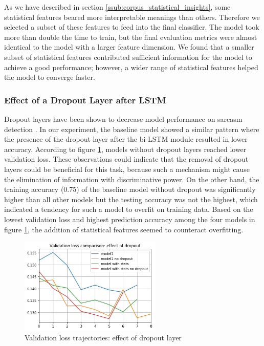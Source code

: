 \documentclass[12pt]{diazessay} %
\begin{document}
{As we have described in section \ref{ssub:corpus_statistical_insights}, some statistical features beared more interpretable meanings than others. Therefore we selected a subset of these features to feed into the final classifier. The model took more than double the time to train, but the final evaluation metrics were almost identical to the model with a larger feature dimension. We found that a smaller subset of statistical features contributed sufficient information for the model to achieve a good performance; however, a wider range of statistical features helped the model to converge faster. 

\subsubsection{Effect of a Dropout Layer after LSTM} %
\label{ssub:effect_of_a_dropout_layer_after_lstm}


Dropout layers have been shown to decrease model performance on sarcasm detection \citep{ghosh2016}. In our experiment, the baseline model showed a similar pattern where the presence of the dropout layer after the bi-LSTM module resulted in lower accuracy. According to figure \ref{figure:dropout}, models without dropout layers reached lower validation loss. These observations could indicate that the removal of dropout layers could be beneficial for this task, because such a mechanism might cause the elimination of information with discriminative power. On the other hand, the training accuracy (0.75) of the baseline model without dropout was significantly higher than all other models but the testing accuracy was not the highest, which indicated a tendency for such a model to overfit on training data. Based on the lowest validation loss and highest prediction accuracy among the four models in figure \ref{figure:dropout}, the addition of statistical features seemed to counteract overfitting. 

\begin{figure}[h!]
    \centering
    \includegraphics[width=0.6\textwidth]{graphs/loss_plots/dropout.png}
    \caption{Validation loss trajectories: effect of dropout layer}
    \label{figure:dropout}
\end{figure}

}
\end{document}
